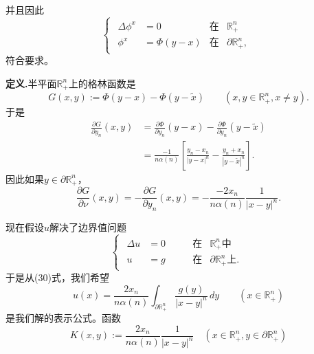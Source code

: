 \documentclass[leqno]{article}
\numberwithin{equation}{subsection}%
\begin{document}
并且因此
\begin{equation*}
\begin{cases}
\begin{aligned}
\Delta \phi^{x}&=0\qquad&\text{在}&\mathbb{R}_{+}^{n}\\
\phi^{x}&=\Phi(y-x)&\text{在}&\partial\mathbb{R}_{+}^{n},
\end{aligned}
\end{cases}
\end{equation*}
符合要求。
\par
\noindent\textbf{定义.}半平面$\mathbb{R}_{+}^{n}$上的格林函数是
\begin{equation*}
G(x,y):=\Phi(y-x)-\Phi(y-\tilde{x})\qquad(x,y\in\mathbb{R}_{+}^{n},x\neq y).
\end{equation*}
于是
\begin{equation*}
\begin{aligned}
\frac{\partial G}{\partial y_{n}}(x,y)&=\frac{\partial \Phi}{\partial y_{n}}(y-x)-\frac{\partial \Phi}{\partial y_{n}}(y-\tilde{x})\\
&=\frac{-1}{n\alpha(n)}\left[\frac{y_{n}-x_{n}}{|y-x|^{n}}-\frac{y_{n}+x_{n}}{|y-\tilde{x}|^{n}}\right].
\end{aligned}
\end{equation*}
因此如果$y\in\partial\mathbb{R}_{+}^{n}$，
\begin{equation*}
\frac{\partial G}{\partial\nu}(x,y)=-\frac{\partial G}{\partial y_{n}}(x,y)=-\frac{-2x_{n}}{n\alpha(n)}\frac{1}{|x-y|^{n}}.
\end{equation*}
\par
现在假设$u$解决了边界值问题
\begin{equation}
\begin{cases}
\begin{aligned}
\Delta u&=0\qquad&\text{在}&\mathbb{R}_{+}^{n}\text{中}\\
u&=g&\text{在}&\partial\mathbb{R}_{+}^{n}\text{上}.
\end{aligned}
\end{cases}
\end{equation}
于是从(30)式，我们希望
\begin{equation}
u(x)=\frac{2x_{n}}{n\alpha(n)}\int_{\partial\mathbb{R}_{+}^{n}}\frac{g(y)}{|x-y|^{n}}\,dy\qquad(x\in\mathbb{R}_{+}^{n})
\end{equation}
是我们解的表示公式。函数
\begin{equation*}
K(x,y):=\frac{2x_{n}}{n\alpha(n)}\frac{1}{|x-y|^{n}}\quad(x\in\mathbb{R}_{+}^{n},y\in\partial\mathbb{R}_{+}^{n})
\end{equation*}
\end{document}
